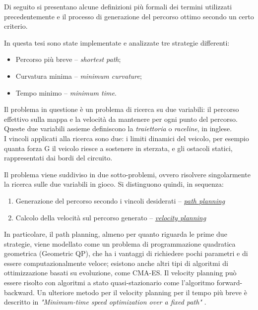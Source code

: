 Di seguito si presentano alcune definizioni più formali dei termini utilizzati precedentemente e il
processo di generazione del percorso ottimo secondo un certo criterio.

\bigskip
\noindent In questa tesi sono state implementate e analizzate tre strategie differenti:
\begin{itemize}
	\setlength\itemsep{0em}
	\item Percorso più breve  -- \textit{shortest path};
	\item Curvatura minima -- \textit{minimum curvature};
	\item Tempo minimo -- \textit{minimum time}.
\end{itemize}

\noindent Il problema in questione è un problema di ricerca su due variabili: il percorso effettivo sulla mappa e
la velocità da mantenere per ogni punto del percorso. Queste due variabili assieme definiscono la
\textit{traiettoria} o \textit{raceline}, in inglese.\\
I vincoli applicati alla ricerca sono due: i limiti dinamici del veicolo, per esempio quanta forza G il
veicolo riesce a sostenere in sterzata, e gli ostacoli statici, rappresentati dai bordi del circuito.

\bigskip
\noindent Il problema viene suddiviso in due sotto-problemi, ovvero risolvere singolarmente la ricerca sulle due
variabili in gioco. Si distinguono quindi, in sequenza:
\begin{enumerate}
	\setlength\itemsep{0em}
	\item Generazione del percorso secondo i vincoli desiderati -- \hyperref[sec:path-models]{\textit{path
		planning}}
	\item Calcolo della velocità sul percorso generato -- \hyperref[sec:velocity-plan]{\textit{velocity
		planning}}
\end{enumerate}
In particolare, il path planning, almeno per quanto riguarda le prime due strategie, viene modellato come
un problema di programmazione quadratica geometrica (Geometric QP), che ha i vantaggi di richiedere pochi
parametri e di essere computazionalmente veloce; esistono anche altri tipi di algoritmi di ottimizzazione
basati su evoluzione, come CMA-ES. Il velocity planning può essere risolto con algoritmi a stato
quasi-stazionario come l'algoritmo forward-backward. Un ulteriore metodo per il velocity planning per il
tempo più breve è descritto in \textit{"Minimum-time speed optimization over a fixed path"}
\cite{lipp2014minimum}.

